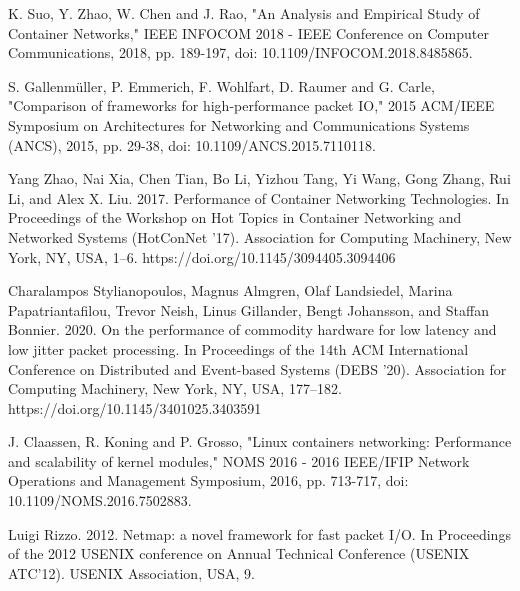 \documentclass[conference]{IEEEtran}
\begin{document}
%
%
%
\begin{thebibliography}{1}

K. Suo, Y. Zhao, W. Chen and J. Rao, "An Analysis and Empirical Study of Container Networks," IEEE INFOCOM 2018 - IEEE Conference on Computer Communications, 2018, pp. 189-197, doi: 10.1109/INFOCOM.2018.8485865.

S. Gallenmüller, P. Emmerich, F. Wohlfart, D. Raumer and G. Carle, "Comparison of frameworks for high-performance packet IO," 2015 ACM/IEEE Symposium on Architectures for Networking and Communications Systems (ANCS), 2015, pp. 29-38, doi: 10.1109/ANCS.2015.7110118.

Yang Zhao, Nai Xia, Chen Tian, Bo Li, Yizhou Tang, Yi Wang, Gong Zhang, Rui Li, and Alex X. Liu. 2017. Performance of Container Networking Technologies. In Proceedings of the Workshop on Hot Topics in Container Networking and Networked Systems (HotConNet '17). Association for Computing Machinery, New York, NY, USA, 1–6. https://doi.org/10.1145/3094405.3094406

Charalampos Stylianopoulos, Magnus Almgren, Olaf Landsiedel, Marina Papatriantafilou, Trevor Neish, Linus Gillander, Bengt Johansson, and Staffan Bonnier. 2020. On the performance of commodity hardware for low latency and low jitter packet processing. In Proceedings of the 14th ACM International Conference on Distributed and Event-based Systems (DEBS '20). Association for Computing Machinery, New York, NY, USA, 177–182. https://doi.org/10.1145/3401025.3403591

J. Claassen, R. Koning and P. Grosso, "Linux containers networking: Performance and scalability of kernel modules," NOMS 2016 - 2016 IEEE/IFIP Network Operations and Management Symposium, 2016, pp. 713-717, doi: 10.1109/NOMS.2016.7502883.

Luigi Rizzo. 2012. Netmap: a novel framework for fast packet I/O. In Proceedings of the 2012 USENIX conference on Annual Technical Conference (USENIX ATC'12). USENIX Association, USA, 9.


\end{thebibliography}
\end{document}
